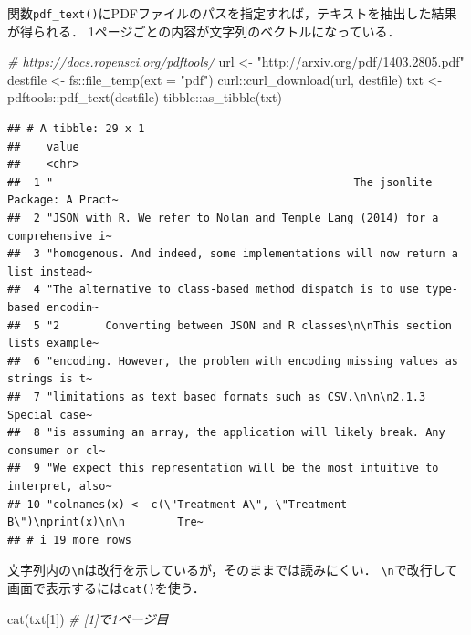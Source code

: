 \documentclass[
]{article}
\newenvironment{Shaded}{\begin{snugshade}}{\end{snugshade}}
\newcommand{\AttributeTok}[1]{\textcolor[rgb]{0.77,0.63,0.00}{#1}}
\newcommand{\CommentTok}[1]{\textcolor[rgb]{0.56,0.35,0.01}{\textit{#1}}}
\newcommand{\DecValTok}[1]{\textcolor[rgb]{0.00,0.00,0.81}{#1}}
\newcommand{\FunctionTok}[1]{\textcolor[rgb]{0.00,0.00,0.00}{#1}}
\newcommand{\NormalTok}[1]{#1}
\newcommand{\OtherTok}[1]{\textcolor[rgb]{0.56,0.35,0.01}{#1}}
\newcommand{\SpecialCharTok}[1]{\textcolor[rgb]{0.00,0.00,0.00}{#1}}
\newcommand{\StringTok}[1]{\textcolor[rgb]{0.31,0.60,0.02}{#1}}
\begin{document}
関数\texttt{pdf\_text()}にPDFファイルのパスを指定すれば，テキストを抽出した結果が得られる．
1ページごとの内容が文字列のベクトルになっている．

\begin{Shaded}
\begin{Highlighting}[]
  \CommentTok{\# https://docs.ropensci.org/pdftools/}
\NormalTok{url }\OtherTok{\textless{}{-}} \StringTok{"http://arxiv.org/pdf/1403.2805.pdf"}
\NormalTok{destfile }\OtherTok{\textless{}{-}}\NormalTok{ fs}\SpecialCharTok{::}\FunctionTok{file\_temp}\NormalTok{(}\AttributeTok{ext =} \StringTok{"pdf"}\NormalTok{)}
\NormalTok{curl}\SpecialCharTok{::}\FunctionTok{curl\_download}\NormalTok{(url, destfile)}
\NormalTok{txt }\OtherTok{\textless{}{-}}\NormalTok{ pdftools}\SpecialCharTok{::}\FunctionTok{pdf\_text}\NormalTok{(destfile)}
\NormalTok{tibble}\SpecialCharTok{::}\FunctionTok{as\_tibble}\NormalTok{(txt)}
\end{Highlighting}
\end{Shaded}

\begin{verbatim}
## # A tibble: 29 x 1
##    value                                                                        
##    <chr>                                                                        
##  1 "                                              The jsonlite Package: A Pract~
##  2 "JSON with R. We refer to Nolan and Temple Lang (2014) for a comprehensive i~
##  3 "homogenous. And indeed, some implementations will now return a list instead~
##  4 "The alternative to class-based method dispatch is to use type-based encodin~
##  5 "2       Converting between JSON and R classes\n\nThis section lists example~
##  6 "encoding. However, the problem with encoding missing values as strings is t~
##  7 "limitations as text based formats such as CSV.\n\n\n2.1.3      Special case~
##  8 "is assuming an array, the application will likely break. Any consumer or cl~
##  9 "We expect this representation will be the most intuitive to interpret, also~
## 10 "colnames(x) <- c(\"Treatment A\", \"Treatment B\")\nprint(x)\n\n        Tre~
## # i 19 more rows
\end{verbatim}

文字列内の\texttt{\textbackslash{}n}は改行を示しているが，そのままでは読みにくい．
\texttt{\textbackslash{}n}で改行して画面で表示するには\texttt{cat()}を使う．

\begin{Shaded}
\begin{Highlighting}[]
\FunctionTok{cat}\NormalTok{(txt[}\DecValTok{1}\NormalTok{])  }\CommentTok{\# [1]で1ページ目}
\end{Highlighting}
\end{Shaded}
\end{document}
